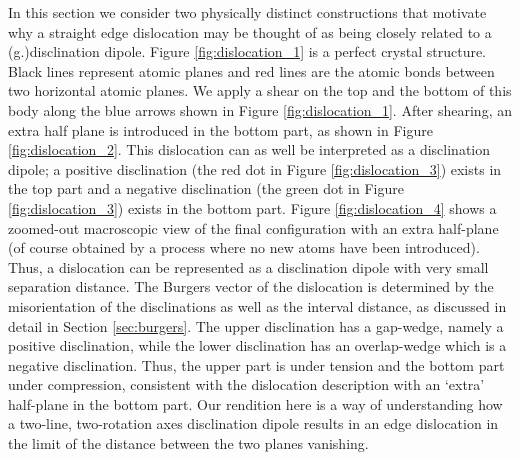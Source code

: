 \documentclass[11pt,letterpaper]{article}
\begin{document}
In this section we consider two physically distinct constructions that motivate why a straight edge dislocation may be thought of as being closely related to a (g.)disclination dipole.  Figure \ref{fig:dislocation_1} is a perfect crystal structure. Black lines represent atomic planes and red lines are the atomic bonds between two horizontal atomic planes. We apply a shear on the top and the bottom of this body along the blue arrows shown in Figure \ref{fig:dislocation_1}. After shearing, an extra half plane is introduced in the bottom part, as shown in Figure \ref{fig:dislocation_2}. This dislocation can as well be interpreted as a disclination dipole; a positive disclination (the red dot in Figure \ref{fig:dislocation_3}) exists in the top part and a negative disclination (the green dot in Figure \ref{fig:dislocation_3}) exists in the bottom part. Figure \ref{fig:dislocation_4} shows a zoomed-out macroscopic view of the final configuration with an extra half-plane (of course obtained by a  process where no new atoms have been introduced). Thus, a dislocation can be represented as a disclination dipole with very small separation distance. The Burgers vector of the dislocation is determined by the misorientation of the disclinations as well as the interval distance, as discussed in detail in Section \ref{sec:burgers}. The upper disclination has a gap-wedge, namely a positive disclination, while the lower disclination has an overlap-wedge which is a negative disclination. Thus, the upper part is under tension and the bottom part under compression, consistent with the dislocation description with an `extra' half-plane in the bottom part. Our rendition here is a way of understanding how a two-line, two-rotation axes disclination dipole \cite{romanov2009application} results in an edge dislocation in the limit of the distance between the two planes vanishing.
\end{document}
